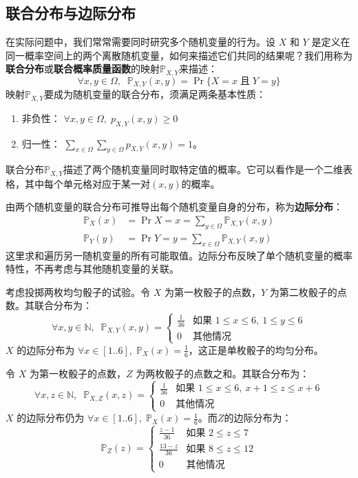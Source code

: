 \documentclass[12pt,UTF8]{ctexbook}
\begin{document}
\subsection{联合分布与边际分布}

在实际问题中，我们常常需要同时研究多个随机变量的行为。设 \(X\) 和 \(Y\) 是定义在同一概率空间上的两个离散随机变量，如何来描述它们共同的结果呢？我们用称为\textbf{联合分布}或\textbf{联合概率质量函数}的映射$\mathbb{P}_{X,Y}$来描述：
\[
\forall x, y \in \Omega,\;\; \mathbb{P}_{X,Y}(x,y) = \Pr{\{X = x\; \mbox{且}\; Y = y\}}
\]
映射$\mathbb{P}_{X,Y}$要成为随机变量的联合分布，须满足两条基本性质：
\begin{enumerate}
    \item 非负性： \( \forall x, y \in \Omega,\; p_{X,Y}(x,y) \geq 0\) 
    \item 归一性： \( \displaystyle\sum_{x\in \Omega} \sum_{y\in \Omega} p_{X,Y}(x,y) = 1\)。
\end{enumerate}
联合分布$\mathbb{P}_{X,Y}$描述了两个随机变量同时取特定值的概率。它可以看作是一个二维表格，其中每个单元格对应于某一对$(x,y)$的概率。

由两个随机变量的联合分布可推导出每个随机变量自身的分布，称为\textbf{边际分布}：
\begin{align*}
\mathbb{P}_X(x) &= \Pr{X = x} = \sum_{y\in \Omega} \mathbb{P}_{X,Y}(x,y) \\
\mathbb{P}_Y(y) &= \Pr{Y = y} = \sum_{x\in \Omega} \mathbb{P}_{X,Y}(x,y)
\end{align*}
这里求和遍历另一随机变量的所有可能取值。边际分布反映了单个随机变量的概率特性，不再考虑与其他随机变量的关联。

\begin{ex}
考虑投掷两枚均匀骰子的试验。令 \(X\) 为第一枚骰子的点数，\(Y\) 为第二枚骰子的点数。其联合分布为：
\[
\forall x,y \in \mathbb{N},\;\;
\mathbb{P}_{X,Y}(x,y) = \begin{cases} 
\frac{1}{36} & \text{如果 } 1 \leq x \leq 6,\ 1 \leq y \leq 6 \\
0 & \text{其他情况}
\end{cases}
\]
\(X\) 的边际分布为 \(\forall x\in [1..6],\; \mathbb{P}_X(x) = \frac{1}{6}\)，这正是单枚骰子的均匀分布。

令 \(X\) 为第一枚骰子的点数，\(Z\) 为两枚骰子的点数之和。其联合分布为：
\[
\forall x,z \in \mathbb{N},\;\;
\mathbb{P}_{X,Z}(x,z) = \begin{cases} 
\frac{1}{36} & \text{如果 } 1 \leq x \leq 6,\ x+1 \leq z \leq x+6 \\
0 & \text{其他情况}
\end{cases}
\]
\(X\) 的边际分布仍为 \(\forall x\in [1..6],\; \mathbb{P}_X(x) = \frac{1}{6}\)。而$Z$的边际分布为：
\[
\mathbb{P}_Z(z) = \begin{cases} 
\frac{z-1}{36} & \text{如果 } 2 \leq z \leq 7 \\
\frac{13-z}{36} & \text{如果 } 8 \leq z \leq 12 \\
0 & \text{其他情况}
\end{cases}
\]

\end{ex}
\end{document}

